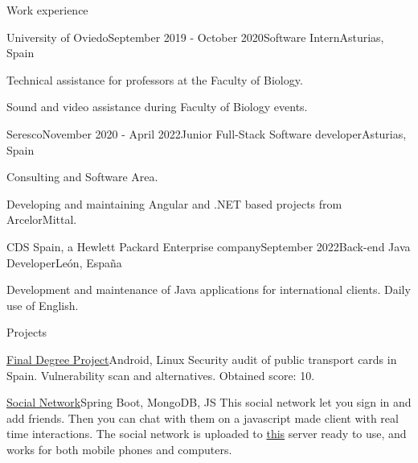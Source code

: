 \documentclass{resume} %
\begin{document}
\begin{rSection}{Work experience}


\begin{rSubsection}{University of Oviedo}{September 2019 - October 2020}{Software Intern}{Asturias, Spain}
\item Technical assistance for professors at the Faculty of Biology.
\item Sound and video assistance during Faculty of Biology events.
\end{rSubsection}

\begin{rSubsection}{Seresco}{November 2020 - April 2022}{Junior Full-Stack Software developer}{Asturias, Spain}
\item Consulting and Software Area.
\item Developing and maintaining Angular and .NET based projects from ArcelorMittal.
\end{rSubsection}

\begin{rSubsection}{CDS Spain, a Hewlett Packard Enterprise company}{September 2022}{Back-end Java Developer}{León, España}
\item Development and maintenance of Java applications for international clients. Daily use of English.
\end{rSubsection}

\end{rSection}


\begin{rSection}{Projects}


\begin{rSubsection}{\href{https://github.com/alexl0/tfg}{Final Degree Project}}{Android, Linux}{}{}
Security audit of public transport cards in Spain. Vulnerability scan and alternatives.
Obtained score: 10.
\end{rSubsection}

\begin{rSubsection}{\href{https://chatwithyouwant.herokuapp.com}{Social Network}}{Spring Boot, MongoDB, JS}{}{}
This social network let you sign in and add friends. Then you can chat with them on a javascript made client with real time interactions.
The social network is uploaded to \href{https://chatwithyouwant.herokuapp.com}{this} server ready to use, and works for both mobile phones and computers.
\end{rSubsection}


\end{rSection}
\end{document}
